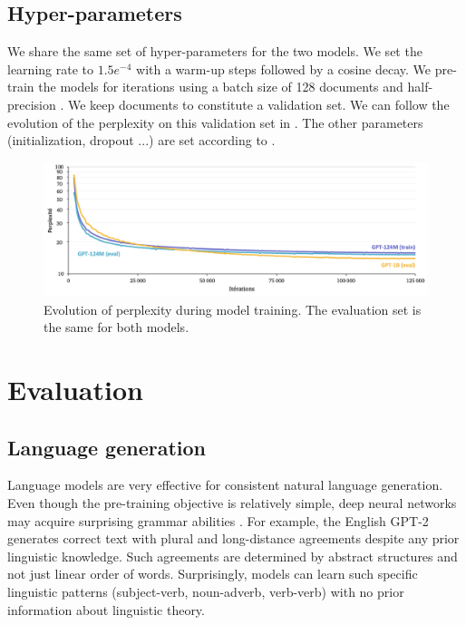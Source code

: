 \subsection{Hyper-parameters}

We share the same set of hyper-parameters for the two models. We set the learning rate to $1.5e^{-4}$ with a  warm-up steps followed by a cosine decay. We pre-train the models for  iterations using a batch size of 128 documents and half-precision \parencite{micikevicius_18}. We keep  documents to constitute a validation set. We can follow the evolution of the perplexity on this validation set in . The other parameters (initialization, dropout ...) are set according to \textcite{radford_2018}.

\begin{figure}[!htb]
\begin{center}
\includegraphics[width=16cm]{images/ppl-training-5.png}
\end{center}
\caption{Evolution of perplexity during model training. The evaluation set is the same for both models.}
\end{figure}

\section{Evaluation}

\subsection{Language generation}

Language models are very effective for consistent natural language generation. Even though the pre-training objective is relatively simple, deep neural networks may acquire surprising grammar abilities \parencite{linzen_2020}. For example, the English GPT-2 generates correct text with plural and long-distance agreements despite any prior linguistic knowledge. Such agreements are determined by abstract structures and not just linear order of words. Surprisingly, models can learn such specific linguistic patterns (subject-verb, noun-adverb, verb-verb) with no prior information about linguistic theory. 

